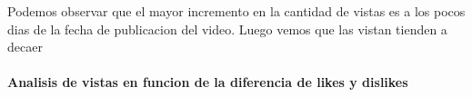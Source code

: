             \begin{figure}[ht]
            \end{figure}
        \FloatBarrier
        Podemos observar que el mayor incremento en la cantidad de vistas es a
        los pocos dias de la fecha de publicacion del video. Luego vemos que
        las vistan tienden a decaer
        \newpage

        \paragraph{Analisis de vistas en funcion de la diferencia de likes y dislikes}

